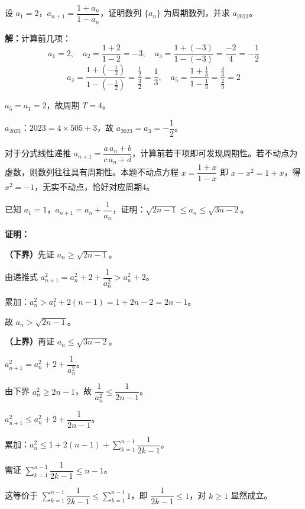 \documentclass[12pt, a4paper]{ctexart}
\begin{document}
\begin{examplebox}[【例题5】递推数列的周期性]
设 $a_1 = 2$，$a_{n+1} = \dfrac{1+a_n}{1-a_n}$，证明数列 $\{a_n\}$ 为周期数列，并求 $a_{2023}$。
\end{examplebox}

\textbf{解：}计算前几项：
\[
a_1 = 2,\quad a_2 = \frac{1+2}{1-2} = -3,\quad a_3 = \frac{1+(-3)}{1-(-3)} = \frac{-2}{4} = -\frac{1}{2}
\]
\[
a_4 = \frac{1+(-\frac{1}{2})}{1-(-\frac{1}{2})} = \frac{\frac{1}{2}}{\frac{3}{2}} = \frac{1}{3},\quad a_5 = \frac{1+\frac{1}{3}}{1-\frac{1}{3}} = \frac{\frac{4}{3}}{\frac{2}{3}} = 2
\]

$a_5 = a_1 = 2$，故周期 $T = 4$。

$a_{2023}$：$2023 = 4 \times 505 + 3$，故 $a_{2023} = a_3 = -\dfrac{1}{2}$。

\begin{tipbox}[方法总结]
对于分式线性递推 $a_{n+1} = \dfrac{a\,a_n+b}{c\,a_n+d}$，计算前若干项即可发现周期性。若不动点为虚数，则数列往往具有周期性。本题不动点方程 $x = \dfrac{1+x}{1-x}$ 即 $x - x^2 = 1 + x$，得 $x^2 = -1$，无实不动点，恰好对应周期4。
\end{tipbox}

\begin{examplebox}[【例题6】数学归纳法证明数列不等式]
已知 $a_1 = 1$，$a_{n+1} = a_n + \dfrac{1}{a_n}$，证明：$\sqrt{2n-1} \leq a_n \leq \sqrt{3n-2}$。
\end{examplebox}

\textbf{证明：}

\textbf{（下界）}先证 $a_n \geq \sqrt{2n-1}$。

由递推式 $a_{n+1}^2 = a_n^2 + 2 + \dfrac{1}{a_n^2} > a_n^2 + 2$。

累加：$a_n^2 > a_1^2 + 2(n-1) = 1 + 2n - 2 = 2n - 1$。

故 $a_n > \sqrt{2n-1}$。\;\checkmark

\textbf{（上界）}再证 $a_n \leq \sqrt{3n-2}$。

$a_{n+1}^2 = a_n^2 + 2 + \dfrac{1}{a_n^2}$。

由下界 $a_n^2 \geq 2n-1$，故 $\dfrac{1}{a_n^2} \leq \dfrac{1}{2n-1}$。

$a_{n+1}^2 \leq a_n^2 + 2 + \dfrac{1}{2n-1}$。

累加：$a_n^2 \leq 1 + 2(n-1) + \sum_{k=1}^{n-1}\dfrac{1}{2k-1}$。

需证 $\displaystyle\sum_{k=1}^{n-1}\dfrac{1}{2k-1} \leq n - 1$。

这等价于 $\displaystyle\sum_{k=1}^{n-1}\dfrac{1}{2k-1} \leq \sum_{k=1}^{n-1} 1$，即 $\dfrac{1}{2k-1} \leq 1$，对 $k\geq 1$ 显然成立。
\end{document}
